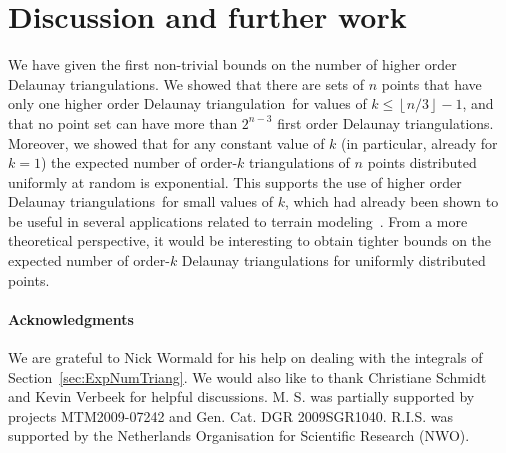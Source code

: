 \documentclass {journal}
\newcommand {\hodt}{higher order Delaunay triangulation}
\newcommand {\hodts}{higher order Delaunay triangulations}
\newcommand {\fodts}{first order Delaunay triangulations}
\begin{document}
\section{Discussion and further work}
\label{sec:discussion} We have given the first non-trivial bounds
on the number of \hodts. We showed that there are sets of $n$
points that have only one \hodt\ for values of $k \leq
\left\lfloor n/3 \right\rfloor-1$, and that no point set can have
more than $2^{n-3}$ \fodts. Moreover, we showed that for any
constant value of $k$ (in particular, already for $k=1$) the
expected number of order-$k$ triangulations of $n$ points
distributed uniformly at random is exponential. This supports the
use of \hodts\ for small values of $k$, which had already been
shown to be useful in several applications related to terrain
modeling~\cite{kkl-grtho-07}. From a more theoretical perspective,
it would be interesting to obtain tighter bounds on the expected number of
order-$k$ Delaunay triangulations for uniformly distributed points.
\paragraph{Acknowledgments} We are grateful to Nick Wormald for his help on dealing with the integrals of Section~\ref{sec:ExpNumTriang}. We would also like to thank Christiane Schmidt and Kevin Verbeek for helpful discussions.
M. S. was partially supported by projects MTM2009-07242 and Gen. Cat. DGR
2009SGR1040.
R.I.S. was supported by the Netherlands Organisation for
  Scientific Research (NWO).


\end{document}
